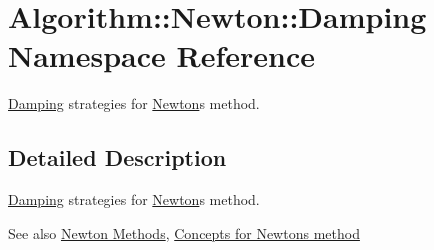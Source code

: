 \hypertarget{namespaceAlgorithm_1_1Newton_1_1Damping}{}\section{Algorithm\+:\+:Newton\+:\+:Damping Namespace Reference}
\label{namespaceAlgorithm_1_1Newton_1_1Damping}


\hyperlink{namespaceAlgorithm_1_1Newton_1_1Damping}{Damping} strategies for \hyperlink{namespaceAlgorithm_1_1Newton}{Newton}\textquotesingle{}s method.  




\subsection{Detailed Description}
\hyperlink{namespaceAlgorithm_1_1Newton_1_1Damping}{Damping} strategies for \hyperlink{namespaceAlgorithm_1_1Newton}{Newton}\textquotesingle{}s method. 

\begin{DoxySeeAlso}{See also}
\hyperlink{group__NewtonGroup}{Newton Methods}, \hyperlink{group__NewtonConceptGroup}{Concepts for Newton\textquotesingle{}s method} 
\end{DoxySeeAlso}
